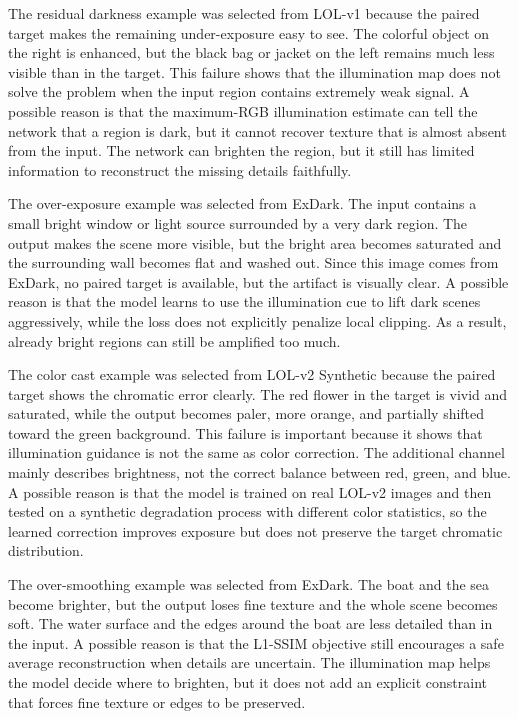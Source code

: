 The residual darkness example was selected from LOL-v1 because the paired target makes the remaining under-exposure easy to see. The colorful object on the right is enhanced, but the black bag or jacket on the left remains much less visible than in the target. This failure shows that the illumination map does not solve the problem when the input region contains extremely weak signal. A possible reason is that the maximum-RGB illumination estimate can tell the network that a region is dark, but it cannot recover texture that is almost absent from the input. The network can brighten the region, but it still has limited information to reconstruct the missing details faithfully.

The over-exposure example was selected from ExDark. The input contains a small bright window or light source surrounded by a very dark region. The output makes the scene more visible, but the bright area becomes saturated and the surrounding wall becomes flat and washed out. Since this image comes from ExDark, no paired target is available, but the artifact is visually clear. A possible reason is that the model learns to use the illumination cue to lift dark scenes aggressively, while the loss does not explicitly penalize local clipping. As a result, already bright regions can still be amplified too much.

The color cast example was selected from LOL-v2 Synthetic because the paired target shows the chromatic error clearly. The red flower in the target is vivid and saturated, while the output becomes paler, more orange, and partially shifted toward the green background. This failure is important because it shows that illumination guidance is not the same as color correction. The additional channel mainly describes brightness, not the correct balance between red, green, and blue. A possible reason is that the model is trained on real LOL-v2 images and then tested on a synthetic degradation process with different color statistics, so the learned correction improves exposure but does not preserve the target chromatic distribution.

The over-smoothing example was selected from ExDark. The boat and the sea become brighter, but the output loses fine texture and the whole scene becomes soft. The water surface and the edges around the boat are less detailed than in the input. A possible reason is that the L1-SSIM objective still encourages a safe average reconstruction when details are uncertain. The illumination map helps the model decide where to brighten, but it does not add an explicit constraint that forces fine texture or edges to be preserved.

